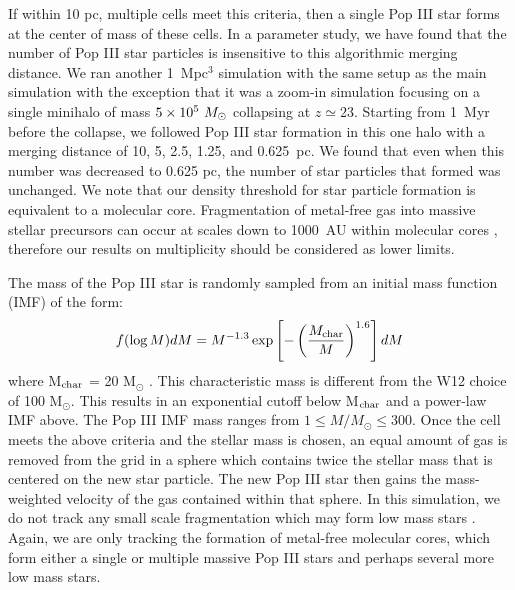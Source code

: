 \documentclass[fleqn,usenatbib]{mnras}
\begin{document}
If within 10 pc, multiple cells meet this criteria, then a single Pop III star forms at the center of mass of these cells. In a parameter study, we have found that the number of Pop III star particles is insensitive to this algorithmic merging distance. We ran another 1~Mpc$^3$ simulation with the same setup as the main simulation with the exception that it was a zoom-in simulation focusing on a single minihalo of mass $5 \times 10^5~\Ms$ collapsing at $z \simeq 23$.  Starting from 1~Myr before the collapse, we followed Pop III star formation in this one halo with a merging distance of 10, 5, 2.5, 1.25, and 0.625~pc.  We found that even when this number was decreased to 0.625 pc, the number of star particles that formed was unchanged.  We note that our density threshold for star particle formation is equivalent to a molecular core.  Fragmentation of metal-free gas into massive stellar precursors can occur at scales down to 1000~AU within molecular cores \citep[e.g.][]{Turk09, Stacy11}, therefore our results on multiplicity should be considered as lower limits.

The mass of the Pop III star is randomly sampled from an initial mass function (IMF) of the form:
\begin{equation} \label{IMF}
	f(\log M)dM = M^{-1.3} \exp \left[-\left( \frac{M_{\rm char}}{M}\right)^{1.6} \right]dM
\end{equation}
where M$_{\rm char}$ = 20 M$_{\odot}$ \citep{Hirano17}. This characteristic mass is different from the W12 choice of 100 M$_{\odot}$. This results in an exponential cutoff below M$_{\rm char}$ and a power-law IMF above. The Pop III IMF mass ranges from $1 \leq M / M_{\odot} \leq 300$. Once the cell meets the above criteria and the stellar mass is chosen, an equal amount of gas is removed from the grid in a sphere which contains twice the stellar mass that is centered on the new star particle. The new Pop III star then gains the mass-weighted velocity of the gas contained within that sphere. In this simulation, we do not track any small scale fragmentation which may form low mass stars \citep{Greif11_P3Cluster}. Again, we are only tracking the formation of metal-free molecular cores, which form either a single or multiple massive Pop III stars and perhaps several more low mass stars.
\end{document}
